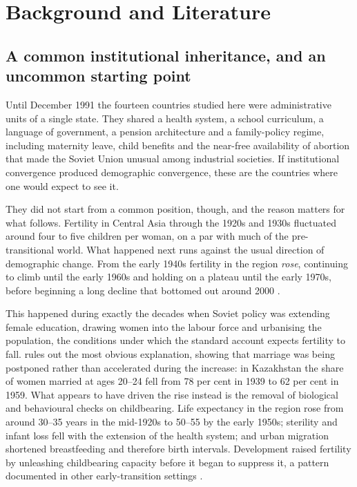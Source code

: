 
\section{Background and Literature}
\label{sec:background}

\subsection{A common institutional inheritance, and an uncommon starting point}
\label{sec:soviet-inheritance}

Until December 1991 the fourteen countries studied here were administrative units of a single state. They shared a health system, a school curriculum, a language of government, a pension architecture and a family-policy regime, including maternity leave, child benefits and the near-free availability of abortion that made the Soviet Union unusual among industrial societies. If institutional convergence produced demographic convergence, these are the countries where one would expect to see it.

They did not start from a common position, though, and the reason matters for what follows. Fertility in Central Asia through the 1920s and 1930s fluctuated around four to five children per woman, on a par with much of the pre-transitional world. What happened next runs against the usual direction of demographic change. From the early 1940s fertility in the region \emph{rose}, continuing to climb until the early 1960s and holding on a plateau until the early 1970s, before beginning a long decline that bottomed out around 2000 \parencite{spoorenberg2017}.

This happened during exactly the decades when Soviet policy was extending female education, drawing women into the labour force and urbanising the population, the conditions under which the standard account expects fertility to fall. \textcite{spoorenberg2017} rules out the most obvious explanation, showing that marriage was being postponed rather than accelerated during the increase: in Kazakhstan the share of women married at ages 20--24 fell from 78 per cent in 1939 to 62 per cent in 1959. What appears to have driven the rise instead is the removal of biological and behavioural checks on childbearing. Life expectancy in the region rose from around 30--35 years in the mid-1920s to 50--55 by the early 1950s; sterility and infant loss fell with the extension of the health system; and urban migration shortened breastfeeding and therefore birth intervals. Development raised fertility by unleashing childbearing capacity before it began to suppress it, a pattern documented in other early-transition settings \parencite{nag1980,romaniuk1980}.

